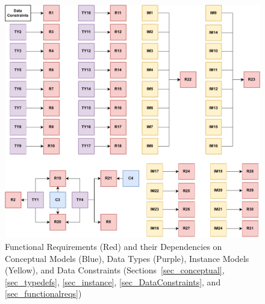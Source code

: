 \begin{figure}[tbh]
    \centering
    \includegraphics[width=\linewidth]{figures/reqs2All.pdf}
    \caption[Functional Requirements and their Dependencies on Conceptual
    Models, Data Types, Instance Models, and Data Constraints]{Functional
    Requirements (Red) and their Dependencies on Conceptual Models (Blue), Data
    Types (Purple), Instance Models (Yellow), and Data Constraints
    (Sections~\ref{sec_conceptual}, \ref{sec_typedefs}, \ref{sec_instance},
    \ref{sec_DataConstraints}, and \ref{sec_functionalreqs})}
    \label{fig:M2R}
\end{figure}